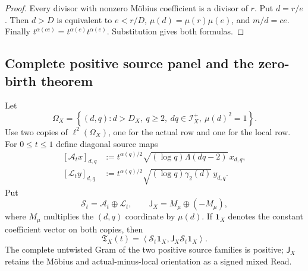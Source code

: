 \documentclass[11pt]{article}
\theoremstyle{definition}
\theoremstyle{remark}
\begin{document}
\begin{proof}
Every divisor with nonzero M\"obius coefficient is a divisor of $r$.  Put
$d=r/e$.  Then $d>D$ is equivalent to $e<r/D$,
$\mu(d)=\mu(r)\mu(e)$, and $m/d=ce$.  Finally
$t^{\alpha(ce)}=t^{\alpha(c)}t^{\alpha(e)}$.  Substitution gives both
formulas.
\end{proof}

\subsection{Complete positive source panel and the zero-birth theorem}
\label{subsec:affpress-zero-birth}

Let
\[
 \Omega_X
 =\left\{(d,q):d>D_X,\ q\ge2,\ dq\in\mathscr I_X^+,\ \mu(d)^2=1\right\}.
\]
Use two copies of $\ell^2(\Omega_X)$, one for the actual row and one for the
local row.  For $0\le t\le1$ define diagonal source maps
\begin{equation}
 \label{eq:affpress-positive-sources}
 \boxed{
 \begin{aligned}
 [\mathscr A_t x]_{d,q}
 &:=t^{\alpha(q)/2}
    \sqrt{(\log q)\Lambda(dq-2)}\,x_{d,q},\\
 [\mathscr L_t y]_{d,q}
 &:=t^{\alpha(q)/2}
    \sqrt{(\log q)\gamma_2(d)}\,y_{d,q}.
 \end{aligned}}
 \tag{P.12}
\end{equation}
Put
\[
 \mathscr S_t=\mathscr A_t\oplus\mathscr L_t,
 \qquad
 \mathsf J_X=M_{\mu}\oplus(-M_{\mu}),
\]
where $M_{\mu}$ multiplies the $(d,q)$ coordinate by $\mu(d)$.  If
$\mathbf1_X$ denotes the constant coefficient vector on both copies, then
\begin{equation}
 \label{eq:affpress-positive-signed-read}
 \boxed{
 \mathfrak T_X(t)
 =\left\langle
   \mathscr S_t\mathbf1_X,
   \mathsf J_X\mathscr S_t\mathbf1_X
  \right\rangle.}
 \tag{P.13}
\end{equation}
The complete untwisted Gram of the two positive source families is positive;
$\mathsf J_X$ retains the M\"obius and actual-minus-local orientation as a
signed mixed Read.
\end{document}
